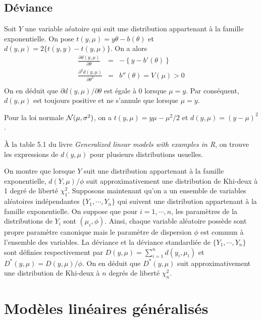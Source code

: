 \documentclass[11pt]{article}
\begin{document}
\subsection{D\'eviance}

Soit $Y$ une variable a\'eatoire qui suit une distribution appartenant \`a la famille exponentielle. On pose $t(y,\mu)=y\theta-b(\theta)$ et $d(y,\mu)=2\{t(y,y)-t(y,\mu)\}$. On a alors 
\begin{eqnarray*}
\frac{\partial d(y,\mu)}{\partial \theta}&=& - \left\{y - b'(\theta)\right\} \\
\frac{\partial^2 d(y,\mu)}{\partial \theta^2}&=&   b''(\theta) = V(\mu) >0 \\
\end{eqnarray*}
\noindent On en d\'eduit que $\partial d(y,\mu)/\partial \theta$ est \'egale \`a 0 lorsque $\mu=y$. Par cons\'equent, $d(y,\mu)$ est toujours positive et ne s'annule que lorsque $\mu=y$. 

\noindent Pour la loi normale ${\cal N}(\mu,\sigma^2)$, on a $t(y,\mu)=y\mu-\mu^2/2$ et $d(y,\mu)=(y-\mu)^2$. 

\noindent \`A la table 5.1 du livre {\it Generalized linear models with examples in R}, on trouve les expressions de $d(y,\mu)$ pour plusieurs distributions usuelles.

\noindent On montre que lorsque $Y$ suit une distribution appartenant \`a la famille exponentielle, $d(Y,\mu)/\phi$ suit approximativement une distribution de Khi-deux \`a 1 degr\'e de libert\'e $\chi^2_1$. Supposons maintenant qu'on a un ensemble de variables al\'eatoires ind\'ependantes $\{Y_1,\cdots,Y_n\}$ qui suivent une distribution appartenant \`a la famille exponentielle. On suppose que pour $i=1,\cdots,n$, les param\`etres de la distributions de $Y_i$ sont $(\mu_i,\phi)$. Ainsi, chaque variable al\'eatoire poss\`ede sont propre param\`etre canonique mais le param\`etre de dispersion $\phi$ est commun \`a l'ensemble des variables. La d\'eviance et la d\'eviance standardi\'ee de $\{Y_1,\cdots,Y_n\}$ sont d\'efinies respectivement par 
$D(y,\mu) = \sum_{i=1}^n d(y_i,\mu_i)$ et $D^*(y,\mu)=D(y,\mu)/\phi$. On en d\'eduit que $D^*(y,\mu)$ suit approximativement une distribution de Khi-deux \`a $n$ degr\'es de libert\'e $\chi^2_n$.

\section{Mod\`eles lin\'eaires g\'en\'eralis\'es}
\end{document}
